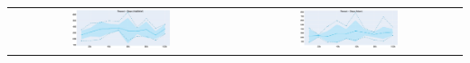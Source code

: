 \begin{table}[htbp]
    \begin{center}
    \begin{tabular}{c c}

    \includegraphics[width=0.45\textwidth]{../openreview/Reproducibility_Challenge_2020/Reproduced_figures/RL/Adabelief_Reward.jpeg} & \includegraphics[width=0.45\textwidth]{../openreview/Reproducibility_Challenge_2020/Reproduced_figures/RL/Adam_Reward.jpeg}  \\
    \end{tabular}
    \vspace{2mm}
     \label{table:Reward_value}
    \end{center}
\end{table}





